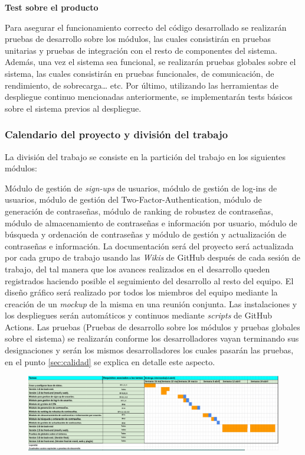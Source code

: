 \documentclass{article}
\begin{document}
\textbf{Test sobre el producto}

Para asegurar el funcionamiento correcto del código desarrollado se realizarán pruebas de desarrollo sobre los módulos, las cuales consistirán en pruebas unitarias y pruebas de integración con el resto de componentes del sistema. Además, una vez el sistema sea funcional, se realizarán pruebas globales sobre el sistema, las cuales consistirán en pruebas funcionales, de comunicación, de rendimiento, de sobrecarga… etc. Por último, utilizando las herramientas de despliegue continuo mencionadas anteriormente, se implementarán tests básicos 
sobre el sistema previos al despliegue.

\subsubsection{Calendario del proyecto y división del trabajo}

La división del trabajo se consiste en la partición del trabajo en los siguientes módulos:

Módulo de gestión de \textit{sign-ups} de usuarios, módulo de gestión de log-ins de usuarios, módulo de gestión del Two-Factor-Authentication, módulo de generación de contraseñas, módulo de ranking de robustez de contraseñas, módulo de almacenamiento de contraseñas e información por usuario, módulo de búsqueda y ordenación de contraseñas y módulo de gestión y actualización de contraseñas e información. La documentación será del proyecto será actualizada por cada grupo de trabajo usando las \textit{Wikis} de GitHub después de cada sesión de trabajo, del tal manera que los avances realizados en el desarrollo queden registrados haciendo posible el seguimiento del desarrollo al resto del equipo. El diseño gráfico será realizado por todos los miembros del equipo mediante la creación de un \textit{mockup} de la misma en una reunión conjunta. Las instalaciones y los despliegues serán automáticos y continuos mediante \textit{scripts} de GitHub Actions. Las pruebas (Pruebas de desarrollo sobre los módulos y pruebas globales sobre el sistema) se realizarán conforme los desarrolladores vayan terminando sus designaciones y serán los mismos desarrolladores los cuales pasarán las pruebas, en el punto \ref{sec:calidad} se explica en detalle este aspecto. 


\begin{figure}[H]
    \centering
        \includegraphics[height=0.18\textheight]{../images/diag-gantt-1.png}
    \label{gantt-1}
\end{figure}
\end{document}
